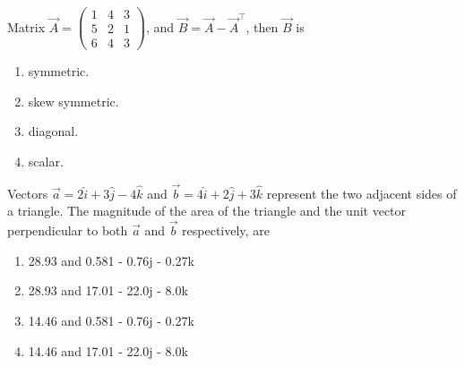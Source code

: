 \item Matrix $\vec{A}=\begin{pmatrix}1&4&3\\ 5&2&1\\ 6&4&3\end{pmatrix}$, and $\vec{B}=\vec{A}-\vec{A}^{\top}$, then $\vec{B}$ is
\hfill{}
	\begin{multicols}{2}
\begin{enumerate}
\item symmetric.
\item skew symmetric.
\item diagonal.
\item scalar.
\end{enumerate}
\end{multicols}
\item Vectors $\vec{a} = 2 \hat{i} + 3 \hat{j} - 4 \hat{k}$ and $\vec{b} = 4 \hat{i} + 2 \hat{j} + 3 \hat{k}$ represent the two adjacent sides of a triangle. The magnitude of the area of the triangle and the unit vector perpendicular to both $\vec{a}$ and $\vec{b}$ respectively, are
\hfill{}
	\begin{multicols}{2}
\begin{enumerate}
\item 28.93 and 0.581 - 0.76j - 0.27k
\item 28.93 and 17.01 - 22.0j - 8.0k
\item 14.46 and 0.581 - 0.76j - 0.27k
\item 14.46 and 17.01 - 22.0j - 8.0k
\end{enumerate}
\end{multicols}
